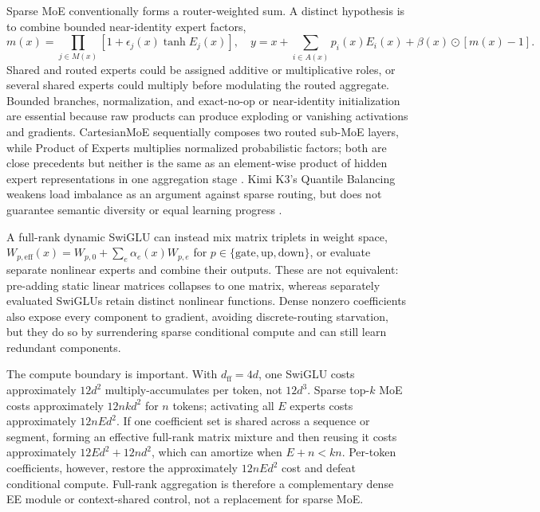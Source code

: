 \documentclass[10pt]{article}
\begin{document}
Sparse MoE conventionally forms a router-weighted sum.  A distinct hypothesis
is to combine bounded near-identity expert factors,
\begin{equation}
 m(x)=\prod_{j\in M(x)}[1+\epsilon_j(x)\tanh E_j(x)],
 \quad
 y=x+\sum_{i\in A(x)}p_i(x)E_i(x)
   +\beta(x)\odot[m(x)-1].
\end{equation}
Shared and routed experts could be assigned additive or multiplicative roles,
or several shared experts could multiply before modulating the routed
aggregate.  Bounded branches, normalization, and exact-no-op or near-identity
initialization are essential because raw products can produce exploding or
vanishing activations and gradients.  CartesianMoE sequentially composes two
routed sub-MoE layers, while Product of Experts multiplies normalized
probabilistic factors; both are close precedents but neither is the same as an
element-wise product of hidden expert representations in one aggregation stage
\citep{su2025cartesianmoe,hinton2002poe}.  Kimi K3's Quantile Balancing weakens
load imbalance as an argument against sparse routing, but does not guarantee
semantic diversity or equal learning progress \citep{kimit2026k3}.

A full-rank dynamic SwiGLU can instead mix matrix triplets in weight space,
$W_{p,\mathrm{eff}}(x)=W_{p,0}+\sum_e\alpha_e(x)W_{p,e}$ for
$p\in\{\mathrm{gate},\mathrm{up},\mathrm{down}\}$, or evaluate separate
nonlinear experts and combine their outputs.  These are not equivalent:
pre-adding static linear matrices collapses to one matrix, whereas separately
evaluated SwiGLUs retain distinct nonlinear functions.  Dense nonzero
coefficients also expose every component to gradient, avoiding discrete-routing
starvation, but they do so by surrendering sparse conditional compute and can
still learn redundant components.

The compute boundary is important.  With $d_{\mathrm{ff}}=4d$, one SwiGLU
costs approximately $12d^2$ multiply-accumulates per token, not $12d^3$.
Sparse top-$k$ MoE costs approximately $12nkd^2$ for $n$ tokens; activating
all $E$ experts costs approximately $12nEd^2$.  If one coefficient set is
shared across a sequence or segment, forming an effective full-rank matrix
mixture and then reusing it costs approximately
$12Ed^2+12nd^2$, which can amortize when $E+n<kn$.  Per-token coefficients,
however, restore the approximately $12nEd^2$ cost and defeat conditional
compute.  Full-rank aggregation is therefore a complementary dense EE module
or context-shared control, not a replacement for sparse MoE.
\end{document}
